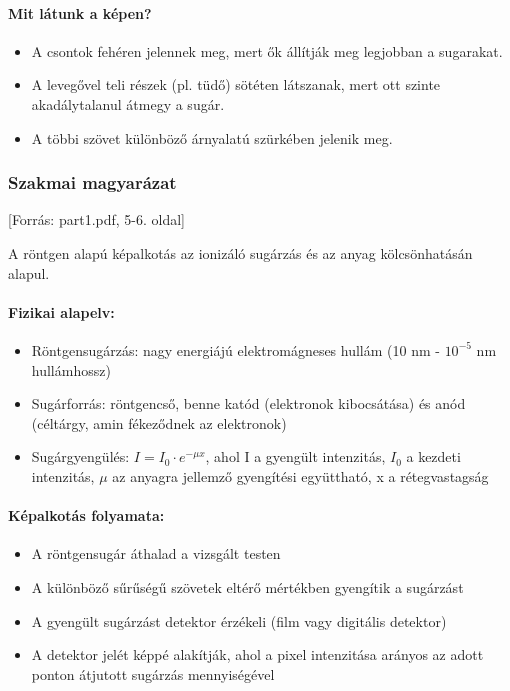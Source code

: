 \documentclass[a4paper,12pt]{article}
\begin{document}
\paragraph{Mit látunk a képen?} \begin{itemize} \item A csontok fehéren jelennek meg, mert ők állítják meg legjobban a sugarakat. \item A levegővel teli részek (pl. tüdő) sötéten látszanak, mert ott szinte akadálytalanul átmegy a sugár. \item A többi szövet különböző árnyalatú szürkében jelenik meg. \end{itemize}

\subsubsection{Szakmai magyarázat} [Forrás: part1.pdf, 5-6. oldal]

A röntgen alapú képalkotás az ionizáló sugárzás és az anyag kölcsönhatásán alapul.

\paragraph{Fizikai alapelv:} \begin{itemize} \item Röntgensugárzás: nagy energiájú elektromágneses hullám (10 nm - $10^{-5}$ nm hullámhossz) \item Sugárforrás: röntgencső, benne katód (elektronok kibocsátása) és anód (céltárgy, amin fékeződnek az elektronok) \item Sugárgyengülés: $I = I_0 \cdot e^{-\mu x}$, ahol I a gyengült intenzitás, $I_0$ a kezdeti intenzitás, $\mu$ az anyagra jellemző gyengítési együttható, x a rétegvastagság \end{itemize}

\paragraph{Képalkotás folyamata:} \begin{itemize} \item A röntgensugár áthalad a vizsgált testen \item A különböző sűrűségű szövetek eltérő mértékben gyengítik a sugárzást \item A gyengült sugárzást detektor érzékeli (film vagy digitális detektor) \item A detektor jelét képpé alakítják, ahol a pixel intenzitása arányos az adott ponton átjutott sugárzás mennyiségével \end{itemize}
\end{document}

